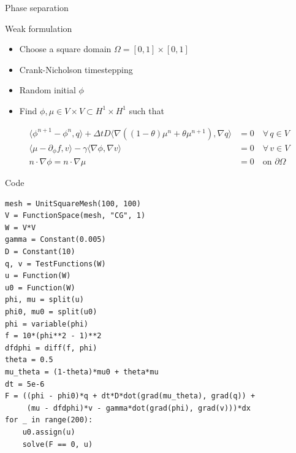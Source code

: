 \documentclass[presentation]{beamer}
\begin{document}
\begin{frame}[label=sec-4-4]{Phase separation}
\begin{block}{Weak formulation}
\begin{itemize}
\item Choose a square domain $\Omega = [0, 1] \times [0, 1]$
\item Crank-Nicholson timestepping
\item Random initial $\phi$
\item Find $\phi, \mu \in V \times V \subset H^1 \times H^1$ such that
\end{itemize}
\begin{equation*}
\begin{aligned}
\langle \phi^{n+1} - \phi^n, q \rangle + \Delta t D \langle \nabla ((1 - \theta)\mu^{n} + \theta \mu^{n+1}), \nabla q \rangle &= 0 \quad \forall\, q \in V\\
\langle \mu - \partial_\phi f, v \rangle - \gamma \langle \nabla \phi, \nabla v \rangle &= 0 \quad \forall\, v \in V\\
n\cdot\nabla \phi = n\cdot\nabla \mu &= 0 \quad\text{on $\partial\Omega$}
\end{aligned}
\end{equation*}

\end{block}
\end{frame}
\begin{frame}[fragile,label=sec-4-5]{Code}
 \begin{verbatim}
mesh = UnitSquareMesh(100, 100)
V = FunctionSpace(mesh, "CG", 1)
W = V*V
gamma = Constant(0.005)
D = Constant(10)
q, v = TestFunctions(W)
u = Function(W)
u0 = Function(W)
phi, mu = split(u)
phi0, mu0 = split(u0)
phi = variable(phi)
f = 10*(phi**2 - 1)**2
dfdphi = diff(f, phi)
theta = 0.5
mu_theta = (1-theta)*mu0 + theta*mu
dt = 5e-6
F = ((phi - phi0)*q + dt*D*dot(grad(mu_theta), grad(q)) + 
     (mu - dfdphi)*v - gamma*dot(grad(phi), grad(v)))*dx
for _ in range(200):
    u0.assign(u)
    solve(F == 0, u)
\end{verbatim}
\end{frame}
\end{document}
